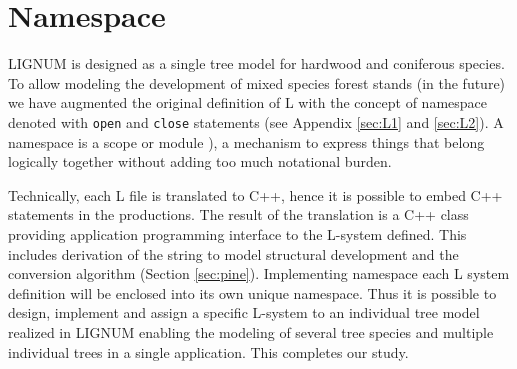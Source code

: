 \section{Namespace}\label{sec:namespace}
LIGNUM is designed as a  single tree model for hardwood and coniferous
species.  To  allow modeling the  development of mixed  species forest
stands (in the future) we  have augmented the original definition of L
with  the   concept  of  namespace  denoted   with  \texttt{open}  and
\texttt{close}    statements    (see    Appendix   \ref{sec:L1}    and
\ref{sec:L2}).     A    namespace     is    a    scope    or    module
\citep{stroustrup:97}),  a  mechanism to  express  things that  belong
logically together without adding too much notational burden.
 
Technically, each L file is translated to C++, hence it is possible to
embed C++ statements in the productions. The result of the translation
is  a C++  class providing  application programming  interface  to the
L-system  defined. This  includes derivation  of the  string  to model
structural   development  and   the   conversion  algorithm   (Section
\ref{sec:pine}).  Implementing namespace each L system definition will
be  enclosed into its  own unique  namespace. Thus  it is  possible to
design, implement and assign a specific L-system to an individual tree
model realized in LIGNUM enabling the modeling of several tree species
and multiple individual trees  in a single application. This completes
our study.

